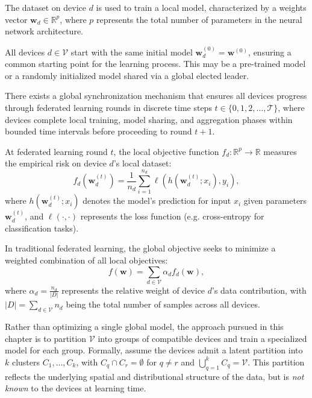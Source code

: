 The dataset on device $d$ is used to train a local model, 
 characterized by a weights vector $\mathbf{w}_d \in \mathbb{R}^p$, 
 where $p$ represents the total number of parameters in the neural network architecture. 
%
\begin{assumption}\label{assumption:shared-model-initialization}
All devices $d \in \mathcal{V}$ start with the same initial model $\mathbf{w}_d^{(0)} = \mathbf{w}^{(0)}$, 
 ensuring a common starting point for the learning process.
%
This may be a pre-trained model or a randomly initialized model shared via a global elected leader.
\end{assumption}

\begin{assumption}\label{assumption:synchronized-fl-rounds}
There exists a global synchronization mechanism that ensures all devices 
 progress through federated learning rounds in discrete time steps $t \in \{0, 1, 2, \ldots, \mathcal{T}\}$, 
 where devices complete local training, model sharing, and aggregation phases 
 within bounded time intervals before proceeding to round $t+1$.
\end{assumption}
%
At federated learning round $t$, 
 the local objective function $f_d: \mathbb{R}^p \rightarrow \mathbb{R}$ measures the empirical risk 
 on device $d$'s local dataset:
%
\begin{equation}
f_d(\mathbf{w}_d^{(t)}) = \frac{1}{n_d} \sum_{i=1}^{n_d} \ell(h(\mathbf{w}_d^{(t)}; x_i), y_i),
\end{equation}
%
where $h(\mathbf{w}_d^{(t)}; x_i)$ denotes the model's prediction for input $x_i$ given parameters $\mathbf{w}_d^{(t)}$, 
 and $\ell(\cdot, \cdot)$ represents the loss function (e.g. cross-entropy for classification tasks).

In traditional federated learning, 
 the global objective seeks to minimize a weighted combination of all local objectives:
\begin{equation}
  f(\mathbf{w}) = \sum_{d \in \mathcal{V}} \alpha_d f_d(\mathbf{w}),
\end{equation}
%
where $\alpha_d = \frac{n_d}{|D|}$ represents the relative weight of device $d$'s data contribution, 
 with $|D| = \sum_{d \in \mathcal{V}} n_d$ being the total number of samples across all devices.

Rather than optimizing a single global model,
 the approach pursued in this chapter is to partition $\mathcal{V}$ into groups of compatible devices
 and train a specialized model for each group.
%
Formally, assume the devices admit a latent partition into $k$ clusters
 $C_1, \ldots, C_k$, with $C_q \cap C_r = \emptyset$ for $q \neq r$
 and $\bigcup_{q=1}^k C_q = \mathcal{V}$.
%
This partition reflects the underlying spatial and distributional structure of the data,
 but is \emph{not known} to the devices at learning time.

